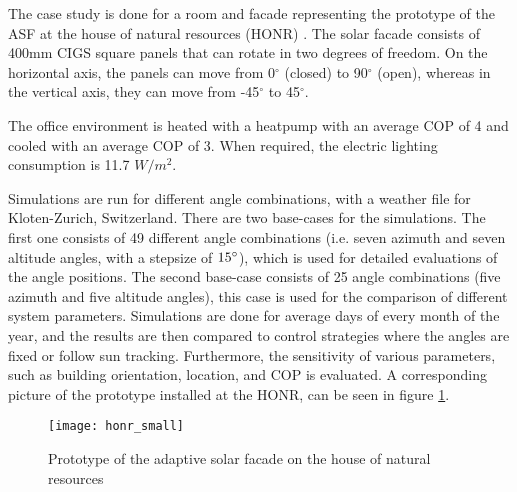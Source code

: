 		The case study is done for a room and facade representing the prototype of the ASF at the house of natural resources (HONR) \cite{nagy2015frontiers}.  The solar facade consists of 400mm CIGS square panels that can rotate in two degrees of freedom. On the horizontal axis, the panels can move from 0$^{\circ}$ (closed) to 90$^{\circ}$ (open), whereas in the vertical axis, they can move from -45$^{\circ}$ to 45$^{\circ}$. %

		The office environment is heated with a heatpump with an average COP of 4 and cooled with an average COP of 3. When required, the electric lighting consumption is 11.7 $W/m^2$. 


		Simulations are run for different angle combinations, with a weather file for Kloten-Zurich, Switzerland. There are two base-cases for the simulations. The first one consists of 49 different angle combinations (i.e. seven azimuth and seven altitude angles, with a stepsize of $15\degree$), which is used for detailed evaluations of the angle positions. The second base-case consists of 25 angle combinations (five azimuth and five altitude angles), this case is used for the comparison of different system parameters. Simulations are done for average days of every month of the year, and the results are then compared to control strategies where the angles are fixed or follow sun tracking. Furthermore, the sensitivity of various parameters, such as building orientation, location, and COP is evaluated. A corresponding picture of the prototype installed at the HONR, can be seen in figure \ref{fig:honr}. 

		\begin{figure}[ht] %
			\begin{center}
			\texttt{[image: honr\_small]}
			\caption{Prototype of the adaptive solar facade on the house of natural resources}
			\label{fig:honr}
			\end{center} 
		\end{figure}



